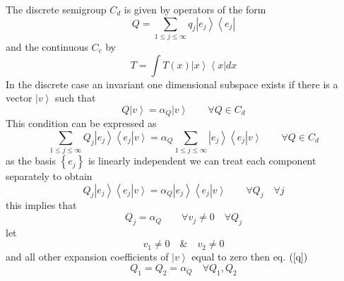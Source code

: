 \documentclass[aps,preprint]{revtex4}%
\begin{document}
The discrete semigroup $C_{d}$ is given by operators of the form
\begin{equation}
Q=%
{\displaystyle\sum\limits_{1\leq j\leq\infty}}
q_{j}\left\vert e_{j}\right\rangle \left\langle e_{j}\right\vert
\end{equation}
and the continuous $C_{c}$ by
\begin{equation}
T=%
{\displaystyle\int}
T\left(  x\right)  \left\vert x\right\rangle \left\langle x\right\vert dx
\end{equation}
In the discrete case an invariant one dimensional subspace exists if there is
a vector $\left\vert v\right\rangle $ such that%
\begin{equation}
Q\left\vert v\right\rangle =\alpha_{Q}\left\vert v\right\rangle \qquad\forall
Q\in C_{d}%
\end{equation}
This condition can be expressed as
\begin{equation}%
{\displaystyle\sum\limits_{1\leq j\leq\infty}}
Q_{j}\left\vert e_{j}\right\rangle \left\langle e_{j}\right\vert \left.
v\right\rangle =\alpha_{Q}%
{\displaystyle\sum\limits_{1\leq j\leq\infty}}
\left\vert e_{j}\right\rangle \left\langle e_{j}\right\vert \left.
v\right\rangle \qquad\forall Q\in C_{d}%
\end{equation}
as the basis $\left\{  e_{j}\right\}  $ is linearly independent we can treat
each component separately to obtain%
\begin{equation}
Q_{j}\left\vert e_{j}\right\rangle \left\langle e_{j}\right\vert \left.
v\right\rangle =\alpha_{Q}\left\vert e_{j}\right\rangle \left\langle
e_{j}\right\vert \left.  v\right\rangle \qquad\forall Q_{j}\quad\forall j
\end{equation}
this implies that
\begin{equation}
Q_{j}=\alpha_{Q}\qquad\forall v_{j}\neq0\quad\forall Q_{j} \label{q}%
\end{equation}
let
\begin{equation}
v_{1}\neq0\quad\&\quad v_{2}\neq0
\end{equation}
and all other expansion coefficients of $\left\vert v\right\rangle $ equal to
zero then eq. $\left(  \ref{q}\right)  $
\begin{equation}
Q_{1}=Q_{2}=\alpha_{Q}\quad\forall Q_{1},Q_{2} \label{multi}%
\end{equation}
\end{document}
